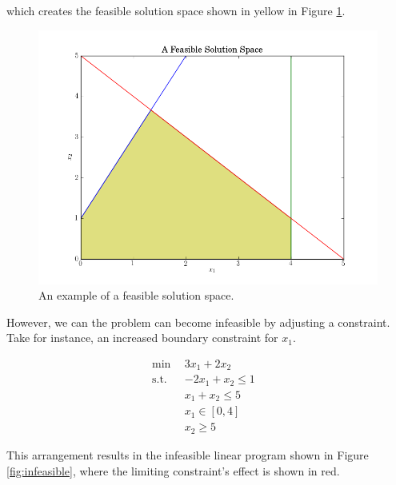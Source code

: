 which creates the feasible solution space shown in yellow in
Figure \ref{fig:feasible}.

\begin{figure}[H]
  \begin{center}
    \includegraphics[width=\linewidth]{./chapters/litreview/plots/feasible.png}
  \caption{An example of a feasible solution space.}
  \label{fig:feasible}
  \end{center}
\end{figure}

However, we can the problem can become infeasible by adjusting a
constraint. Take for instance, an increased boundary constraint for $x_1$.

\begin{subequations}\label{eqs:infeas}
  \begin{align}
    \min \:\: & 
    3 x_1 + 2 x_2
    & \label{eqs:infeas_obj} \\
    \text{s.t.} \:\: &
    -2 x_1 + x_2 \leq 1 \\
    &
    x_1 + x_2 \leq 5 
    & \label{eqs:infeas_sup} \\
    &
    x_1 \in [0, 4]
    &\label{eqs:infeas_x1} \\
    &
    x_2 \geq 5
    &\label{eqs:infeas_x2}
  \end{align}
\end{subequations}

This arrangement results in the infeasible linear program shown in
Figure \ref{fig:infeasible}, where the limiting constraint's effect is shown in
red.

